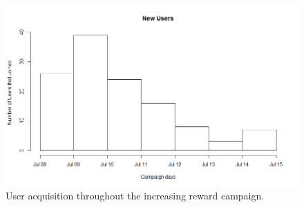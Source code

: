 \documentclass[letterpaper]{article}
\begin{document}
\begin{figure}[htb]
	\begin{center}
		\includegraphics[width=1\linewidth]{images/NewUsers_I}
		\caption{User acquisition throughout the increasing reward campaign.\label{fig:newusers2}}
	\end{center}
\end{figure}




\end{document}

